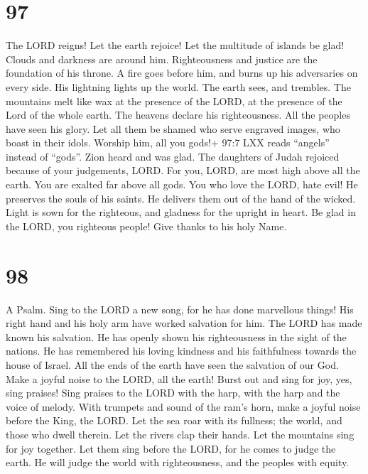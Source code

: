 \hypertarget{section-87}{%
\section{97}\label{section-87}}

 The LORD reigns! Let the earth rejoice! Let the multitude
of islands be glad!  Clouds and darkness are around him.
Righteousness and justice are the foundation of his throne. 
A fire goes before him, and burns up his adversaries on every side.
 His lightning lights up the world. The earth sees, and
trembles.  The mountains melt like wax at the presence of
the LORD, at the presence of the Lord of the whole earth. 
The heavens declare his righteousness. All the peoples have seen his
glory.  Let all them be shamed who serve engraved images,
who boast in their idols. Worship him, all you gods!+ 97:7 LXX reads
``angels'' instead of ``gods''.  Zion heard and was glad.
The daughters of Judah rejoiced because of your judgements, LORD.
 For you, LORD, are most high above all the earth. You are
exalted far above all gods.  You who love the LORD, hate
evil! He preserves the souls of his saints. He delivers them out of the
hand of the wicked.  Light is sown for the righteous, and
gladness for the upright in heart.  Be glad in the LORD,
you righteous people! Give thanks to his holy Name.

\hypertarget{section-88}{%
\section{98}\label{section-88}}

A Psalm.  Sing to the LORD a new song, for he has done
marvellous things! His right hand and his holy arm have worked salvation
for him.  The LORD has made known his salvation. He has
openly shown his righteousness in the sight of the nations. 
He has remembered his loving kindness and his faithfulness towards the
house of Israel. All the ends of the earth have seen the salvation of
our God.  Make a joyful noise to the LORD, all the earth!
Burst out and sing for joy, yes, sing praises!  Sing praises
to the LORD with the harp, with the harp and the voice of melody.
 With trumpets and sound of the ram's horn, make a joyful
noise before the King, the LORD.  Let the sea roar with its
fullness; the world, and those who dwell therein.  Let the
rivers clap their hands. Let the mountains sing for joy together.
 Let them sing before the LORD, for he comes to judge the
earth. He will judge the world with righteousness, and the peoples with
equity.

